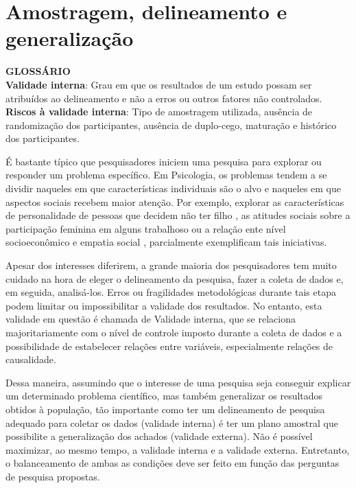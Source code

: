 \documentclass[
]{book}
\newenvironment{glossario}{
  \definecolor{shadecolor}{rgb}{0, 0, 0}  %
  \color{white}
  \begin{shaded}}
 {\end{shaded}}
\begin{document}
\hypertarget{amostragem-delineamento-e-generalizauxe7uxe3o}{%
\section{Amostragem, delineamento e generalização}\label{amostragem-delineamento-e-generalizauxe7uxe3o}}

\begin{glossario}

\textbf{GLOSSÁRIO}\\
\textbf{Validade interna}: Grau em que os resultados de um estudo possam ser atribuídos ao delineamento e não a erros ou outros fatores não controlados.\\
\textbf{Riscos à validade interna}: Tipo de amostragem utilizada, ausência de randomização dos participantes, ausência de duplo-cego, maturação e histórico dos participantes.

\end{glossario}

É bastante típico que pesquisadores iniciem uma pesquisa para explorar ou responder um problema específico. Em Psicologia, os problemas tendem a se dividir naqueles em que características individuais são o alvo e naqueles em que aspectos sociais recebem maior atenção. Por exemplo, explorar as características de personalidade de pessoas que decidem não ter filho \citep{Neal2021}, as atitudes sociais sobre a participação feminina em alguns trabalhoso \citep{Bursztyn2018} ou a relação ente nível socioeconômico e empatia social \citep{Piff2012}, parcialmente exemplificam tais iniciativas.

Apesar dos interesses diferirem, a grande maioria dos pesquisadores tem muito cuidado na hora de eleger o delineamento da pesquisa, fazer a coleta de dados e, em seguida, analisá-los. Erros ou fragilidades metodológicas durante tais etapa podem limitar ou impossibilitar a validade dos resultados. No entanto, esta validade em questão é chamada de Validade interna, que se relaciona majoritariamente com o nível de controle imposto durante a coleta de dados e a possibilidade de estabelecer relações entre variáveis, especialmente relações de causalidade.

Dessa maneira, assumindo que o interesse de uma pesquisa seja conseguir explicar um determinado problema científico, mas também generalizar os resultados obtidos à população, tão importante como ter um delineamento de pesquisa adequado para coletar os dados (validade interna) é ter um plano amostral que possibilite a generalização dos achados (validade externa). Não é possível maximizar, ao mesmo tempo, a validade interna e a validade externa. Entretanto, o balanceamento de ambas as condições deve ser feito em função das perguntas de pesquisa propostas.
\end{document}
